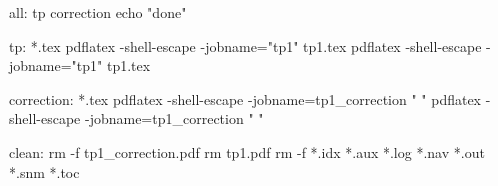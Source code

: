 all: tp correction
	echo "done"


tp: *.tex
	pdflatex -shell-escape -jobname="tp1" tp1.tex
	pdflatex -shell-escape -jobname="tp1" tp1.tex


correction: *.tex
	pdflatex -shell-escape -jobname=tp1_correction "\def\koriG{} "
	pdflatex -shell-escape -jobname=tp1_correction "\def\koriG{} "


clean:
	rm -f tp1_correction.pdf rm tp1.pdf
	rm -f *.idx *.aux *.log *.nav *.out *.snm *.toc